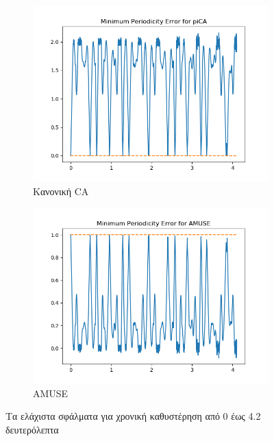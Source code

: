 \begin{figure}[H]
    \centering
    \begin{subfigure}{0.48 \textwidth}
        \centering
       \includegraphics[width=\textwidth]{fwto/pica_error.png}\en
        \caption{\gr Κανονική \en \pi CA} \gr
        \label{fig:5.12a}
    \end{subfigure}
    \hfill
    \begin{subfigure}{0.48 \textwidth}
        \centering
       \includegraphics[width=\textwidth]{fwto/Amuse_Error.png}
        \en
        \caption{AMUSE} \gr
        \label{fig:5.12b}
    \end{subfigure}
    \gr
    \caption{Τα ελάχιστα σφάλματα για χρονική καθυστέρηση από 0 έως 4.2 δευτερόλεπτα}
\end{figure}
